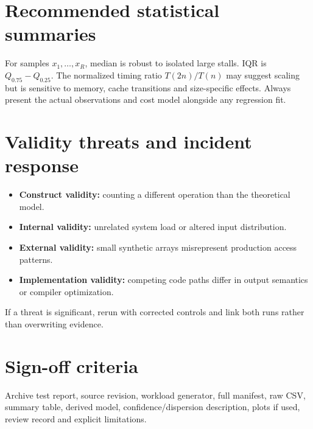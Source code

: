 \documentclass[11pt,letterpaper]{article}
\begin{document}
\section{Recommended statistical summaries}
For samples $x_1,\ldots,x_R$, median is robust to isolated large stalls. IQR is $Q_{0.75}-Q_{0.25}$. The normalized timing ratio $T(2n)/T(n)$ may suggest scaling but is sensitive to memory, cache transitions and size-specific effects. Always present the actual observations and cost model alongside any regression fit.
\section{Validity threats and incident response}
\begin{itemize}
\item \textbf{Construct validity:} counting a different operation than the theoretical model.
\item \textbf{Internal validity:} unrelated system load or altered input distribution.
\item \textbf{External validity:} small synthetic arrays misrepresent production access patterns.
\item \textbf{Implementation validity:} competing code paths differ in output semantics or compiler optimization.
\end{itemize}
If a threat is significant, rerun with corrected controls and link both runs rather than overwriting evidence.
\section{Sign-off criteria}
\begin{evidencebox}Archive test report, source revision, workload generator, full manifest, raw CSV, summary table, derived model, confidence/dispersion description, plots if used, review record and explicit limitations.\end{evidencebox}
\end{document}

